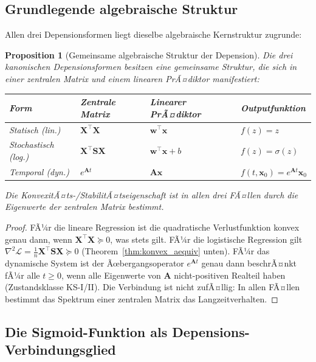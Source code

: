 ﻿\documentclass[12pt, a4paper]{article}
\newtheorem{proposition}[theorem]{Proposition}
\theoremstyle{definition}
\theoremstyle{remark}
\newcommand{\sigmoid}{\sigma}
\newcommand{\vw}{\bm{w}}
\newcommand{\vx}{\bm{x}}
\newcommand{\vX}{\bm{X}}
\newcommand{\vA}{\bm{A}}
\newcommand{\vS}{\bm{S}}
\newcommand{\T}{\top}
\begin{document}
\subsection{Grundlegende algebraische Struktur}

Allen drei Depensionsformen liegt dieselbe algebraische Kernstruktur zugrunde:

\begin{proposition}[Gemeinsame algebraische Struktur der Depension]
\label{prop:struktur}
Die drei kanonischen Depensionsformen besitzen eine gemeinsame Struktur, die sich
in einer zentralen Matrix und einem linearen PrÃ¤diktor manifestiert:

\begin{center}
\renewcommand{\arraystretch}{1.6}
\begin{tabular}{llll}
\toprule
Form & Zentrale Matrix & Linearer PrÃ¤diktor & Outputfunktion \\
\midrule
Statisch (lin.) & $\vX^\T\vX$ & $\vw^\T\vx$ & $f(z) = z$ \\
Stochastisch (log.) & $\vX^\T\vS\vX$ & $\vw^\T\vx + b$ & $f(z) = \sigmoid(z)$ \\
Temporal (dyn.) & $e^{\vA t}$ & $\vA\vx$ & $f(t,\vx_0) = e^{\vA t}\vx_0$ \\
\bottomrule
\end{tabular}
\end{center}
Die KonvexitÃ¤ts-/StabilitÃ¤tseigenschaft ist in allen drei FÃ¤llen durch die
Eigenwerte der zentralen Matrix bestimmt.
\end{proposition}

\begin{proof}
FÃ¼r die lineare Regression ist die quadratische Verlustfunktion konvex genau dann,
wenn $\vX^\T\vX \succeq 0$, was stets gilt. FÃ¼r die logistische Regression gilt
$\nabla^2\mathcal{L} = \frac{1}{n}\vX^\T\vS\vX \succeq 0$ (Theorem~\ref{thm:konvex_aequiv}
unten). FÃ¼r das dynamische System ist der Ãœbergangsoperator $e^{\vA t}$ genau dann
beschrÃ¤nkt fÃ¼r alle $t \geq 0$, wenn alle Eigenwerte von $\vA$ nicht-positiven Realteil
haben (Zustandsklasse KS-I/II). Die Verbindung ist nicht zufÃ¤llig: In allen FÃ¤llen
bestimmt das Spektrum einer zentralen Matrix das Langzeitverhalten.
\end{proof}

\subsection{Die Sigmoid-Funktion als Depensions-Verbindungsglied}
\end{document}

